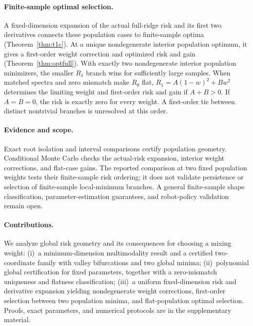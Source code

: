 \paragraph{Finite-sample optimal selection.}
A fixed-dimension expansion of the actual full-ridge risk and its first two derivatives connects these population cases to finite-sample optima (Theorem~\ref{thm:t1c}). At a unique nondegenerate interior population optimum, it gives a first-order weight correction and optimized risk and gain (Theorem~\ref{thm:optfull}). With exactly two nondegenerate interior population minimizers, the smaller $R_1$ branch wins for sufficiently large samples. When matched spectra and zero mismatch make $R_0$ flat, $R_1=A(1-w)^2+Bw^2$ determines the limiting weight and first-order risk and gain if $A+B>0$. If $A=B=0$, the risk is exactly zero for every weight. A first-order tie between distinct nontrivial branches is unresolved at this order.

\paragraph{Evidence and scope.}
Exact root isolation and interval comparisons certify population geometry. Conditional Monte Carlo checks the actual-risk expansion, interior weight corrections, and flat-case gains. The reported comparison at two fixed population weights tests their finite-sample risk ordering; it does not validate persistence or selection of finite-sample local-minimum branches. A general finite-sample shape classification, parameter-estimation guarantees, and robot-policy validation remain open.

\paragraph{Contributions.}
We analyze global risk geometry and its consequences for choosing a mixing weight:
(i)~a minimum-dimension multimodality result and a certified two-coordinate family with valley bifurcations and two global minima;
(ii)~polynomial global certification for fixed parameters, together with a zero-mismatch uniqueness and flatness classification;
(iii)~a uniform fixed-dimension risk and derivative expansion yielding nondegenerate weight corrections, first-order selection between two population minima, and flat-population optimal selection.
Proofs, exact parameters, and numerical protocols are in the supplementary material.
